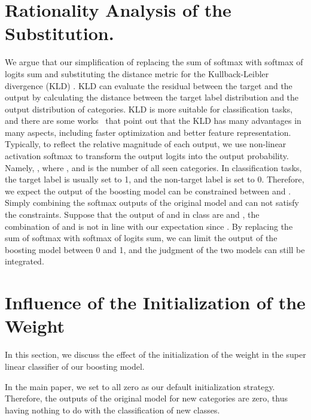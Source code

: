 \documentclass[runningheads]{llncs}
\begin{document}
\section{Rationality Analysis of the Substitution.}\label{sec:1}
We argue that our simplification of replacing the sum of softmax with softmax of logits sum and substituting the distance metric  for the Kullback-Leibler divergence (KLD) . KLD can evaluate the residual between the target and the output by calculating the distance between the target label distribution and the output distribution of categories. KLD is more suitable for classification tasks, and there are some works~\cite{hu2013kullback,rubinstein2004cross} that point out that the KLD has many advantages in many aspects, including faster optimization and better feature representation. Typically, to reflect the relative magnitude of each output, we use non-linear activation softmax to transform the output logits into the output probability. Namely, , where ,  and  is the number of all seen categories. In classification tasks, the target label is usually set to 1, and the non-target label is set to 0. Therefore, we expect the output of the boosting model can be constrained between  and .  Simply combining the softmax outputs of the original model  and  can not satisfy the constraints. Suppose that the output of  and  in class  are  and ,  the combination of  and  is not in line with our expectation since . By replacing the sum of softmax with softmax of logits sum, we can limit the output of the boosting model between 0 and 1, and the judgment of the two models can still be integrated.

\section{Influence of the Initialization of the Weight }\label{sec:2}
In this section, we discuss the effect of the initialization of the weight  in the super linear classifier of our boosting model.


In the main paper, we set  to all zero as our default initialization strategy. Therefore, the outputs of the original model for new categories are zero, thus having nothing to do with the classification of new classes. 
\end{document}
